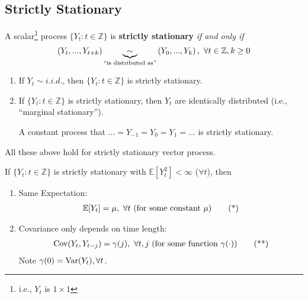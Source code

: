 \documentclass[11pt]{elegantbook}
\begin{document}
\subsection{Strictly Stationary}
\begin{definition}
    A scalar\footnote{i.e., $Y_t$ is $1\times 1$} process $\{Y_t:t\in \mathbb{Z}\}$ is \textbf{strictly stationary} \textit{if and only if}
    \begin{equation}
        \begin{aligned}
            \left(Y_t,...,Y_{t+k}\right)\underbrace{\sim}_\textnormal{``is distributed as''} \left(Y_0,...,Y_{k}\right),\ \forall t\in \mathbb{Z},k\geq 0
        \end{aligned}
        \nonumber
    \end{equation}
\end{definition}
\begin{note}
    \begin{enumerate}
        \item If $Y_t\sim i.i.d.$, then $\{Y_t:t\in \mathbb{Z}\}$ is strictly stationary.
        \item If $\{Y_t:t\in \mathbb{Z}\}$ is strictly stationary, then $Y_t$ are identically distributed (i.e., ``marginal stationary'').
        \begin{example}
            A constant process that $...=Y_{-1}=Y_0=Y_1=...$ is strictly stationary.
        \end{example}
    \end{enumerate}
    All these above hold for strictly stationary vector process.
\end{note}

\begin{lemma}
    If $\{Y_t:t\in \mathbb{Z}\}$ is strictly stationary with $\mathbb{E}[Y_t^2]<\infty$ ($\forall t$), then
    \begin{enumerate}
        \item Same Expectation:
        \begin{equation}
            \begin{aligned}
                \mathbb{E}[Y_t]=\mu,\ \forall t \textnormal{ (for some constant $\mu$)}
            \end{aligned}
            \label{s}
            \tag{*}
        \end{equation}
        \item Covariance only depends on time length:
        \begin{equation}
            \begin{aligned}
                \textnormal{Cov}(Y_t,Y_{t-j})=\gamma(j),\ \forall t,j \textnormal{ (for some function $\gamma(\cdot)$)}
            \end{aligned}
            \label{ss}
            \tag{**}
        \end{equation}
        Note $\gamma(0)= \textnormal{Var}(Y_t),\forall t$.
    \end{enumerate}
\end{lemma}
\end{document}
